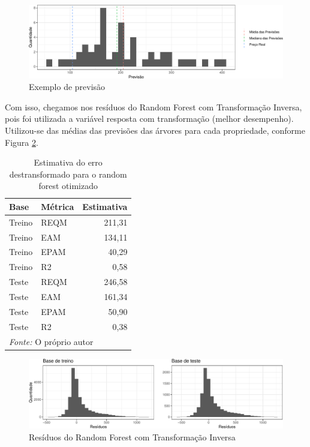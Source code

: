 \documentclass[
	12pt,				%
	a4paper,		%
	oneside,    %
	chapter=TITLE,		   %
	section=TITLE,		   %
	subsection=TITLE,	   %
	subsubsection=TITLE, %
	english,			%
	french,				%
	spanish,			%
	brazil,				%
]{abntex2}
\begin{document}
\begin{figure}
\centering
\includegraphics{00-TCC_files/figure-latex/exemplo_pred-1.pdf}
\caption{\label{exemplo_pred}Exemplo de previsão}
\end{figure}

Com isso, chegamos nos resíduos do Random Forest com Transformação
Inversa, pois foi utilizada a variável resposta com transformação
(melhor desempenho). Utilizou-se das médias das previsões das árvores
para cada propriedade, conforme Figura \ref{resid_rf_inv}.

\begin{table}

\caption{\label{tab:rf1_metricas}Estimativa do erro destransformado para o random forest otimizado}
\centering
\begin{tabular}[t]{l|l|r}
\hline
Base & Métrica & Estimativa\\
\hline
Treino & REQM & 211,31\\
\hline
Treino & EAM & 134,11\\
\hline
Treino & EPAM & 40,29\\
\hline
Treino & R2 & 0,58\\
\hline
Teste & REQM & 246,58\\
\hline
Teste & EAM & 161,34\\
\hline
Teste & EPAM & 50,90\\
\hline
Teste & R2 & 0,38\\
\hline
\multicolumn{3}{l}{\textit{Fonte: } O próprio autor}\\
\end{tabular}
\end{table}

\begin{figure}
\centering
\includegraphics{00-TCC_files/figure-latex/resid_rf_inv-1.pdf}
\caption{\label{resid_rf_inv}Resíduos do Random Forest com Transformação
Inversa}
\end{figure}
\end{document}
